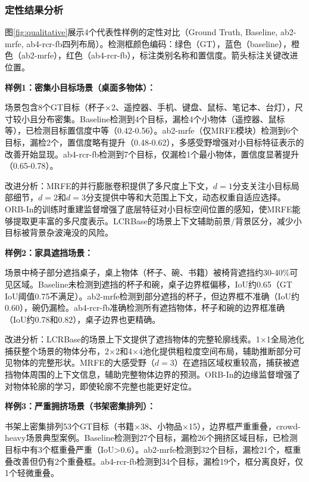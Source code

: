 \documentclass[journal]{IEEEtran}
\begin{document}
\subsubsection{定性结果分析}

图\ref{fig:qualitative}展示4个代表性样例的定性对比（Ground Truth, Baseline, ab2-mrfe, ab4-rcr-fb四列布局）。检测框颜色编码：绿色（GT），蓝色（baseline），橙色（ab2-mrfe），红色（ab4-rcr-fb），标注类别名称和置信度。箭头标注关键改进位置。

\textbf{样例1：密集小目标场景（桌面多物体）：}

场景包含8个GT目标（杯子×2、遥控器、手机、键盘、鼠标、笔记本、台灯），尺寸较小且分布密集。Baseline检测到4个目标，漏检4个小物体（遥控器、鼠标等），已检测目标置信度中等（0.42-0.56）。ab2-mrfe（仅MRFE模块）检测到6个目标，漏检2个，置信度略有提升（0.48-0.62），多感受野增强对小目标特征表示的改善开始显现。ab4-rcr-fb检测到7个目标，仅漏检1个最小物体，置信度显著提升（0.65-0.78）。

改进分析：MRFE的并行膨胀卷积提供了多尺度上下文，$d=1$分支关注小目标局部细节，$d=2$和$d=3$分支提供中等和大范围上下文，动态权重自适应选择。ORB-In的训练时重建监督增强了底层特征对小目标空间位置的感知，使MRFE能够提取更丰富的多尺度表示。LCRBase的场景上下文辅助前景/背景区分，减少小目标被背景杂波淹没的风险。

\textbf{样例2：家具遮挡场景：}

场景中椅子部分遮挡桌子，桌上物体（杯子、碗、书籍）被椅背遮挡约30-40\%可见区域。Baseline未检测到遮挡的杯子和碗，桌子边界框偏移，IoU约0.65（GT IoU阈值0.75不满足）。ab2-mrfe检测到部分遮挡的杯子，但边界框不准确（IoU约0.60），碗仍漏检。ab4-rcr-fb准确检测所有遮挡物体，杯子和碗的边界框准确（IoU约0.78和0.82），桌子边界也更精确。

改进分析：LCRBase的场景上下文提供了遮挡物体的完整轮廓线索。1$\times$1全局池化捕获整个场景的物体分布，2$\times$2和4$\times$4池化提供粗粒度空间布局，辅助推断部分可见物体的完整形状。MRFE的大感受野（$d=3$）在遮挡区域权重较高，捕获被遮挡物体周围的上下文信息，辅助完整物体边界的预测。ORB-In的边缘监督增强了对物体轮廓的学习，即使轮廓不完整也能更好定位。

\textbf{样例3：严重拥挤场景（书架密集排列）：}

书架上密集排列53个GT目标（书籍×38、小物品×15），边界框严重重叠，crowd-heavy场景典型案例。Baseline检测到27个目标，漏检26个拥挤区域目标，已检测目标中有3个框重叠严重（IoU>0.6）。ab2-mrfe检测到32个目标，漏检21个，框重叠改善但仍有2个重叠框。ab4-rcr-fb检测到34个目标，漏检19个，框分离良好，仅1个轻微重叠。
\end{document}
